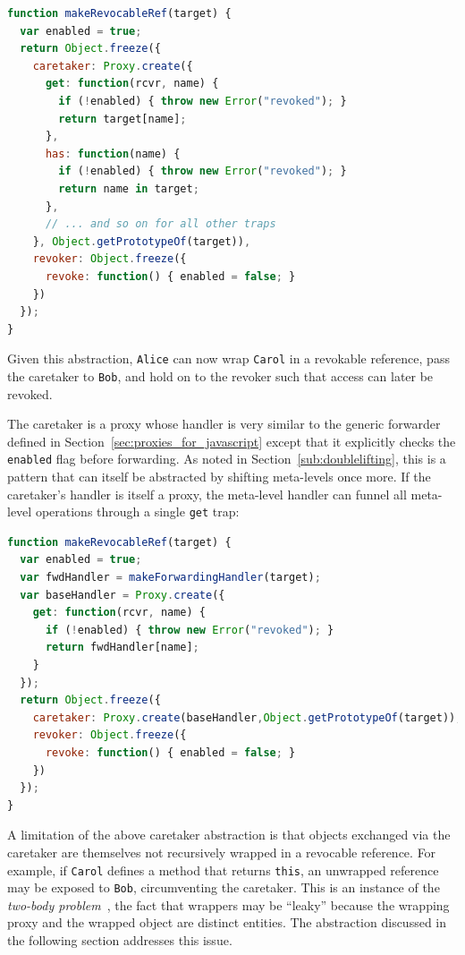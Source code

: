 \documentclass{sig-alternate}
\begin{document}
\begin{lstlisting}[language=javascript]
function makeRevocableRef(target) {
  var enabled = true;
  return Object.freeze({
    caretaker: Proxy.create({
      get: function(rcvr, name) {
        if (!enabled) { throw new Error("revoked"); }
        return target[name];
      },
      has: function(name) {
        if (!enabled) { throw new Error("revoked"); }
        return name in target;      
      },
      // ... and so on for all other traps
    }, Object.getPrototypeOf(target)),
    revoker: Object.freeze({
      revoke: function() { enabled = false; }
    })
  });
}
\end{lstlisting}

Given this abstraction, \texttt{Alice} can now wrap \texttt{Carol} in a revokable reference, pass the caretaker to \texttt{Bob}, and hold on to the revoker such that access can later be revoked.

The caretaker is a proxy whose handler is very similar to the generic forwarder defined in Section~\ref{sec:proxies_for_javascript} except that it explicitly checks the \texttt{enabled} flag before forwarding. As noted in Section~\ref{sub:doublelifting}, this is a pattern that can itself be abstracted by shifting meta-levels once more. If the caretaker's handler is itself a proxy, the meta-level handler can funnel all meta-level operations through a single \texttt{get} trap:

\begin{lstlisting}[language=javascript]
function makeRevocableRef(target) {
  var enabled = true;
  var fwdHandler = makeForwardingHandler(target);
  var baseHandler = Proxy.create({
    get: function(rcvr, name) {
      if (!enabled) { throw new Error("revoked"); }
      return fwdHandler[name];
    }
  });
  return Object.freeze({
    caretaker: Proxy.create(baseHandler,Object.getPrototypeOf(target)),
    revoker: Object.freeze({
      revoke: function() { enabled = false; }
    })
  });
}
\end{lstlisting}

A limitation of the above caretaker abstraction is that objects exchanged via the caretaker are themselves not recursively wrapped in a revocable reference. For example, if \texttt{Carol} defines a method that returns \texttt{this}, an unwrapped reference may be exposed to \texttt{Bob}, circumventing the caretaker. This is an instance of the \emph{two-body problem}~\cite{eugster06uniform}, the fact that wrappers may be ``leaky'' because the wrapping proxy and the wrapped object are distinct entities. The abstraction discussed in the following section addresses this issue.
\end{document}
